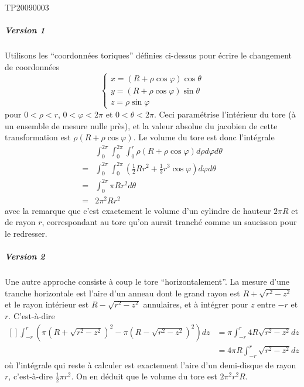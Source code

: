 \begin{corrige}{TP20090003}
\subparagraph{Version 1}
Utilisons les ``coordonnées toriques'' définies ci-dessus pour écrire
le changement de coordonnées
\begin{equation*}
  \begin{cases}
    x = (R + \rho\cos \varphi) \cos \theta\\
    y = (R + \rho\cos \varphi) \sin \theta\\
    z = \rho \sin \varphi%
  \end{cases}
\end{equation*}
pour $0 < \rho < r$, $0 < \varphi < 2\pi$ et $0 < \theta < 2\pi$. Ceci
paramétrise l'intérieur du tore (à un ensemble de mesure nulle près),
et la valeur absolue du jacobien de cette transformation est $\rho (R
+ \rho \cos \varphi)$. Le volume du tore est donc l'intégrale
\begin{equation*}
  \begin{split}
    &\int_0^{2\pi} \int_0^{2\pi} \int_0^r \rho (R + \rho \cos \varphi) d\rho d\varphi  d\theta\\
    = &\int_0^{2\pi} \int_0^{2\pi} \left(\frac12 R r^2 +
      \frac 13 r^3 \cos \varphi\right)  d\varphi  d\theta\\
    = &\int_0^{2\pi}  \pi R r^2  d\theta\\
    = &2 \pi^2 R r^2
  \end{split}
\end{equation*}
avec la remarque que c'est exactement le volume d'un cylindre de
hauteur $2\pi R$ et de rayon $r$, correspondant au tore qu'on aurait
tranché comme un saucisson pour le redresser.


\subparagraph{Version 2}
Une autre approche consiste à coup le tore ``horizontalement''. La
mesure d'une tranche horizontale est l'aire d'un anneau dont le grand
rayon est $R + \sqrt{r^2 - z^2}$ et le rayon intérieur est $R - \sqrt{r^2 - z^2}$
annulaires, et à intégrer pour $z$ entre $-r$ et $r$. C'est-à-dire
\begin{equation}
	\begin{aligned}[]
  		\int_{-r}^r \left(\pi (R+\sqrt{r^2-z^2})^2 - \pi (R-\sqrt{r^2-z^2})^2\right)  d z 	&= \pi \int_{-r}^r 4 R \sqrt{r^2 - z^2}  d z\\
													&= 4 \pi R \int_{-r}^r \sqrt{r^2-z^2}  d z
	\end{aligned}
\end{equation}
où l'intégrale qui reste à calculer est exactement l'aire d'un demi-disque de rayon $r$, c'est-à-dire $\frac{ 1 }{2} \pi r^2$. On en déduit que le
volume du tore est $2 \pi^2 r^2 R$.



\end{corrige}
